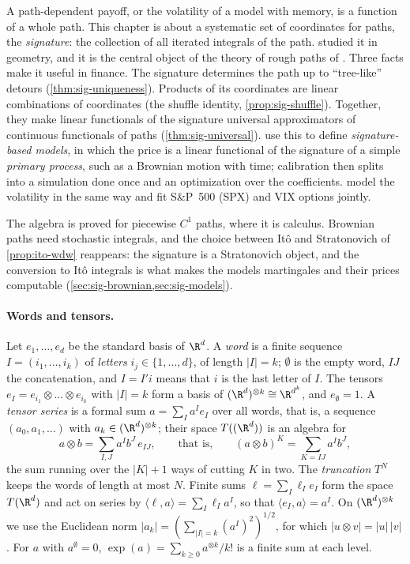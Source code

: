\providecommand{\sigSig}{\operatorname{Sig}}
\providecommand{\sigsh}{\mathbin{\sqcup\mkern-3mu\sqcup}}
\providecommand{\sigX}{\mathbb X}
\providecommand{\sigZ}{\mathbb Z}

A path-dependent payoff, or the volatility of a model with memory, is a function of a whole path.
This chapter is about a systematic set of coordinates for paths, the \emph{signature}: the collection
of all iterated integrals of the path. \textcite{chen-1957,chen-1958} studied it in geometry, and it is the
central object of the theory of rough paths of \textcite{lyons-1998}. Three facts make it useful in
finance. The signature determines the path up to ``tree-like'' detours (\cref{thm:sig-uniqueness}).
Products of its coordinates are linear combinations of coordinates (the shuffle identity,
\cref{prop:sig-shuffle}). Together, they make linear functionals of the signature universal
approximators of continuous functionals of paths (\cref{thm:sig-universal}).
\textcite{cuchiero-gazzani-svaluto-ferro-2023} use this to define \emph{signature-based models}, in which the
price is a linear functional of the signature of a simple \emph{primary process}, such as a Brownian
motion with time; calibration then splits into a simulation done once and an optimization over the
coefficients. \textcite{cuchiero-gazzani-moller-svaluto-ferro-2025} model the volatility in the same way
and fit S\&P~500 (SPX) and VIX options jointly.

The algebra is proved for piecewise $C^1$ paths, where it is calculus. Brownian paths need
stochastic integrals, and the choice between It\^o and Stratonovich of \cref{prop:ito-wdw} reappears:
the signature is a Stratonovich object, and the conversion to It\^o integrals is what makes the models
martingales and their prices computable (\cref{sec:sig-brownian,sec:sig-models}).

\paragraph{Words and tensors.} Let $e_1,\dots,e_d$ be the standard basis of $\R^d$. A \emph{word} is a
finite sequence $I=(i_1,\dots,i_k)$ of \emph{letters} $i_j\in\{1,\dots,d\}$, of length $|I|=k$; $\emptyset$
is the empty word, $IJ$ the concatenation, and $I=I'i$ means that $i$ is the last letter of $I$. The
tensors $e_I=e_{i_1}\otimes\dots\otimes e_{i_k}$ with $|I|=k$ form a basis of $(\R^d)^{\otimes k}\cong\R^{d^k}$,
and $e_\emptyset=1$. A \emph{tensor series} is a formal sum $a=\sum_Ia^Ie_I$ over all words, that is, a
sequence $(a_0,a_1,\dots)$ with $a_k\in(\R^d)^{\otimes k}$; their space $T((\R^d))$ is an algebra for
\[
  a\otimes b=\sum_{I,J}a^Ib^J\,e_{IJ},\qquad\text{that is,}\qquad(a\otimes b)^K=\sum_{K=IJ}a^Ib^J,
\]
the sum running over the $|K|+1$ ways of cutting $K$ in two. The \emph{truncation} $T^N$ keeps the words
of length at most $N$. Finite sums $\ell=\sum_I\ell_Ie_I$ form the space $T(\R^d)$ and act on series by
$\langle\ell,a\rangle=\sum_I\ell_Ia^I$, so that $\langle e_I,a\rangle=a^I$. On $(\R^d)^{\otimes k}$ we use the
Euclidean norm $|a_k|=(\sum_{|I|=k}(a^I)^2)^{1/2}$, for which $|u\otimes v|=|u|\,|v|$. For $a$ with
$a^\emptyset=0$, $\exp(a)=\sum_{k\ge0}a^{\otimes k}/k!$ is a finite sum at each level.

